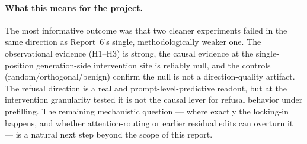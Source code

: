 \documentclass{article}
\begin{document}
\paragraph{What this means for the project.}
The most informative outcome was that two cleaner experiments failed in
the same direction as Report~6's single, methodologically weaker one. The
observational evidence (H1--H3) is strong, the causal evidence at the
single-position generation-side intervention site is reliably null, and
the controls (random/orthogonal/benign) confirm the null is not a
direction-quality artifact. The refusal direction is a real and
prompt-level-predictive readout, but at the intervention granularity
tested it is not the causal lever for refusal behavior under prefilling.
The remaining mechanistic question --- where exactly the locking-in
happens, and whether attention-routing or earlier residual edits can
overturn it --- is a natural next step beyond the scope of this report.



\end{document}
